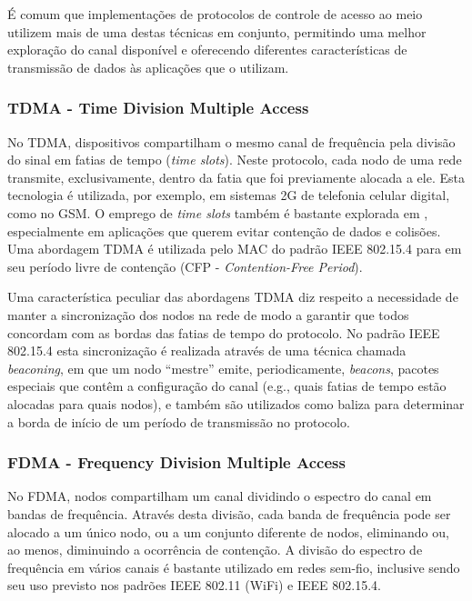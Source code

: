 É comum que implementações de protocolos de controle de acesso ao meio utilizem
mais de uma destas técnicas em conjunto, permitindo uma melhor exploração do
canal disponível e oferecendo diferentes características de transmissão de dados
às aplicações que o utilizam.

\subsubsection{TDMA - Time Division Multiple Access}

No TDMA, dispositivos compartilham o mesmo canal de frequência pela divisão do
sinal em fatias de tempo (\emph{time slots}). Neste protocolo, cada nodo de uma
rede transmite, exclusivamente, dentro da fatia que foi previamente alocada a
ele. Esta tecnologia é utilizada, por exemplo, em sistemas 2G de telefonia
celular digital, como no GSM. O emprego de \emph{time slots} também é bastante
explorada em \rssf, especialmente em aplicações que querem evitar contenção de
dados e colisões. Uma abordagem TDMA é utilizada pelo MAC do padrão IEEE
802.15.4 para em seu período livre de contenção (CFP - \textit{Contention-Free
Period}).

Uma característica peculiar das abordagens TDMA diz respeito a necessidade de
manter a sincronização dos nodos na rede de modo a garantir que todos concordam
com as bordas das fatias de tempo do protocolo. No padrão IEEE 802.15.4 esta
sincronização é realizada através de uma técnica chamada \emph{beaconing}, em
que um nodo ``mestre'' emite, periodicamente, \emph{beacons}, pacotes especiais
que contêm a configuração do canal (e.g., quais fatias de tempo estão alocadas
para quais nodos), e também são utilizados como baliza para determinar a borda
de início de um período de transmissão no protocolo.

\subsubsection{FDMA - Frequency Division Multiple Access}

No FDMA, nodos compartilham um canal dividindo o espectro do canal em bandas de
frequência. Através desta divisão, cada banda de frequência pode ser alocado a
um único nodo, ou a um conjunto diferente de nodos, eliminando ou, ao menos,
diminuindo a ocorrência de contenção. A divisão do espectro de frequência em
vários canais é bastante utilizado em redes sem-fio, inclusive sendo seu uso
previsto nos padrões IEEE 802.11 (WiFi) e IEEE 802.15.4.

